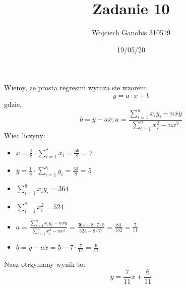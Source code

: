 \documentclass[12pt]{article}
\title{Zadanie 10}
\author{Wojciech Ganobis 310519}
\date{19/05/20}
\begin{document}
\maketitle

Wiemy, ze prosta regresmi wyraza sie wzorem:
$$y = a\cdot x + b$$
gdzie,
$$b = \overline{y} - a\overline{x}; a = \frac{\sum^{n}_{i=1}x_{i}y_{i} - n\overline{x}\overline{y}}{\sum^{n}_{i=1}x^{2}_{i}-nx^{2}}$$
Wiec liczyny:

\begin{itemize}
\item $\overline{x} = \frac{1}{8}\cdot\sum^{8}_{i=1}x_{i}=\frac{56}{8}=7$
\item $\overline{y} = \frac{1}{8}\cdot\sum^{8}_{i=1}y_{i}=\frac{50}{8}=5$
\item $\sum^{8}_{i=1}x_{i}y_{i}=364$
\item $\sum^{8}_{i=1}x^{2}_{i}=524$
\item $a = \frac{\sum^{n}_{i=1}x_{i}y_{i} - n\overline{x}\overline{y}}{\sum^{n}_{i=1}x^{2}_{i}-nx^{2}} = \frac{364-8\cdot7\cdot5}{524-8\cdot7^{2}}=\frac{84}{132}=\frac{7}{11}$
\item $b = \overline{y} - a\overline{x} = 5-7\cdot\frac{7}{11} = \frac{6}{11}$
\end{itemize}

Nasz otrzymany wynik to:
$$y=\frac{7}{11}x+\frac{6}{11}$$
\end{document}
